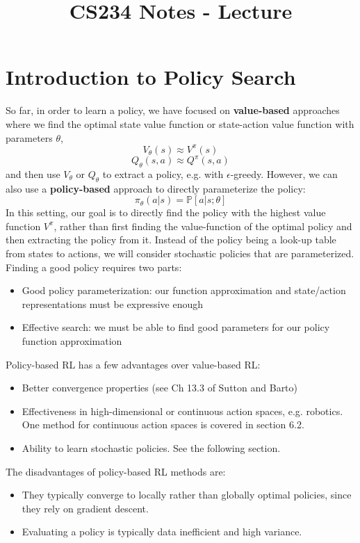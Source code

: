 \documentclass{article}
\title{CS234 Notes - Lecture \lecturenum \\ \lecturetitle }
\author{ \lecturescribe }
\begin{document}
\maketitle

\section{Introduction to Policy Search}
So far, in order to learn a policy, we have focused on \textbf{value-based} approaches where we find the optimal state value function or state-action value function with parameters $\theta$,
\[ V_\theta(s) \approx V^\pi(s) \]
\[ Q_\theta(s,a) \approx Q^\pi(s,a) \]
and then use $V_\theta$ or $Q_\theta$ to extract a policy, e.g. with $\epsilon$-greedy. However, we can also use a \textbf{policy-based} approach to directly parameterize the policy:
\[ \pi_\theta(a|s) = \mathbb{P} [a | s; \theta] \]
In this setting, our goal is to directly find the policy with the highest value function $V^\pi$, rather than first finding the value-function of the optimal policy and then extracting the policy from it. Instead of the policy being a look-up table from states to actions, we will consider stochastic policies that are parameterized. Finding a good policy requires two parts:
\begin{itemize}
    \item Good policy parameterization: our function approximation and state/action representations must be expressive enough
    \item Effective search: we must be able to find good parameters for our policy function approximation
\end{itemize}

Policy-based RL has a few advantages over value-based RL:
\begin{itemize}
\item Better convergence properties (see Ch 13.3 of Sutton and Barto)
\item Effectiveness in high-dimensional or continuous action spaces, e.g. robotics. One method for continuous action spaces is covered in section 6.2.
\item Ability to learn stochastic policies. See the following section.
\end{itemize}
The disadvantages of policy-based RL methods are:
\begin{itemize}
\item They typically converge to locally rather than globally optimal policies, since they rely on gradient descent.
\item Evaluating a policy is typically data inefficient and high variance.
\end{itemize}
\end{document}
